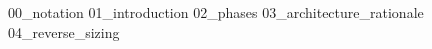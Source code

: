 {00_notation}
\pagebreak
{}
{01_introduction}
{02_phases}
{03_architecture_rationale}
{04_reverse_sizing}
